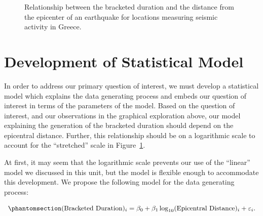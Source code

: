 \documentclass[
  letterpaper,
  DIV=11,
  numbers=noendperiod]{scrreprt}
\theoremstyle{plain}
\theoremstyle{definition}
\theoremstyle{definition}
\theoremstyle{remark}
\begin{document}
\begin{figure}


\caption{\label{fig-regrecap-plot}Relationship between the bracketed
duration and the distance from the epicenter of an earthquake for
locations measuring seismic activity in Greece.}

\end{figure}%

\section{Development of Statistical
Model}\label{development-of-statistical-model}

In order to address our primary question of interest, we must develop a
statistical model which explains the data generating process and embeds
our question of interest in terms of the parameters of the model. Based
on the question of interest, and our observations in the graphical
exploration above, our model explaining the generation of the bracketed
duration should depend on the epicentral distance. Further, this
relationship should be on a logarithmic scale to account for the
``stretched'' scale in Figure~\ref{fig-regrecap-plot}.

At first, it may seem that the logarithmic scale prevents our use of the
``linear'' model we discussed in this unit, but the model is flexible
enough to accommodate this development. We propose the following model
for the data generating process:

\begin{equation}\phantomsection\label{eq-regrecap-model}{(\text{Bracketed Duration})_i = \beta_0 + \beta_1 \log_{10}(\text{Epicentral Distance})_i + \varepsilon_i.}\end{equation}
\end{document}
